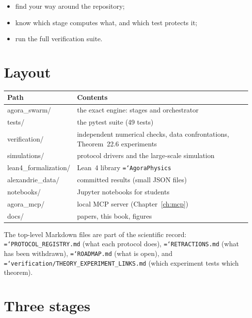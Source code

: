 \documentclass[11pt,a4paper,openany]{book}
\newcommand{\code}[1]{\texttt{\hyphenchar\font=`\-\relax #1}}
\theoremstyle{definition}
\theoremstyle{plain}
\begin{document}
\begin{objectives}
\begin{itemize}
  \item find your way around the repository;
  \item know which stage computes what, and which test protects it;
  \item run the full verification suite.
\end{itemize}
\end{objectives}

\section{Layout}

\begin{center}
\small
\begin{tabular}{>{\ttfamily}l>{\raggedright\arraybackslash}p{9.2cm}}
\toprule
\textrm{Path} & Contents \\
\midrule
agora\_swarm/ & the exact engine: stages and orchestrator \\
tests/ & the pytest suite (49 tests) \\
verification/ & independent numerical checks, data confrontations, Theorem~22.6 experiments \\
simulations/ & protocol drivers and the large-scale simulation \\
lean4\_formalization/ & Lean~4 library \code{AgoraPhysics} \\
alexandrie\_data/ & committed results (small JSON files) \\
notebooks/ & Jupyter notebooks for students \\
agora\_mcp/ & local MCP server (Chapter~\ref{ch:mcp}) \\
docs/ & papers, this book, figures \\
\bottomrule
\end{tabular}
\end{center}

The top-level Markdown files are part of the scientific record: \code{PROTOCOL\_REGISTRY.md}
(what each protocol does), \code{RETRACTIONS.md} (what has been withdrawn),
\code{ROADMAP.md} (what is open), and \code{verification/THEORY\_EXPERIMENT\_LINKS.md} (which
experiment tests which theorem).

\section{Three stages}
\end{document}
